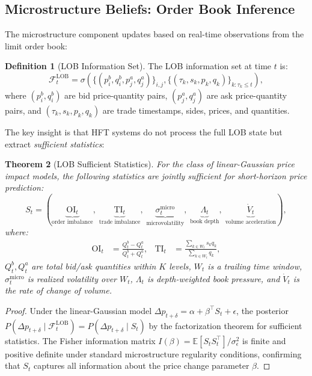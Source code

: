 \documentclass[12pt,a4paper]{article}
\newtheorem{theorem}{Theorem}[section]
\theoremstyle{definition}
\newtheorem{definition}[theorem]{Definition}
\newcommand{\E}{\mathbb{E}}
\newcommand{\F}{\mathcal{F}}
\begin{document}
\subsection{Microstructure Beliefs: Order Book Inference}

The microstructure component updates based on real-time observations from the limit order book:

\begin{definition}[LOB Information Set]\label{def:lob-info}
The LOB information set at time $t$ is:
\begin{equation}
  \F_t^{\mathrm{LOB}} = \sigma\left(\{(p_i^b, q_i^b, p_j^a, q_j^a)\}_{i,j}, \{(\tau_k, s_k, p_k, q_k)\}_{k: \tau_k \leq t}\right),
\end{equation}
where $(p_i^b, q_i^b)$ are bid price-quantity pairs, $(p_j^a, q_j^a)$ are ask price-quantity pairs, and $(\tau_k, s_k, p_k, q_k)$ are trade timestamps, sides, prices, and quantities.
\end{definition}

The key insight is that HFT systems do not process the full LOB state but extract \emph{sufficient statistics}:

\begin{theorem}[LOB Sufficient Statistics]\label{thm:lob-sufficient}
For the class of linear-Gaussian price impact models, the following statistics are jointly sufficient for short-horizon price prediction:
\begin{equation}\label{eq:sufficient-stats}
  S_t = \left(\underbrace{\mathrm{OI}_t}_{\text{order imbalance}},\; \underbrace{\mathrm{TI}_t}_{\text{trade imbalance}},\; \underbrace{\sigma_t^{\mathrm{micro}}}_{\text{microvolatility}},\; \underbrace{\Lambda_t}_{\text{book depth}},\; \underbrace{\dot{V}_t}_{\text{volume acceleration}}\right),
\end{equation}
where:
\begin{align}
  \mathrm{OI}_t &= \frac{Q_t^b - Q_t^a}{Q_t^b + Q_t^a}, &
  \mathrm{TI}_t &= \frac{\sum_{k \in W_t} s_k q_k}{\sum_{k \in W_t} q_k},
\end{align}
$Q_t^b, Q_t^a$ are total bid/ask quantities within $K$ levels, $W_t$ is a trailing time window, $\sigma_t^{\mathrm{micro}}$ is realized volatility over $W_t$, $\Lambda_t$ is depth-weighted book pressure, and $\dot{V}_t$ is the rate of change of volume.
\end{theorem}

\begin{proof}
Under the linear-Gaussian model $\Delta p_{t+\delta} = \alpha + \beta^\top S_t + \epsilon$, the posterior $P(\Delta p_{t+\delta} \mid \F_t^{\mathrm{LOB}}) = P(\Delta p_{t+\delta} \mid S_t)$ by the factorization theorem for sufficient statistics. The Fisher information matrix $I(\beta) = \E[S_t S_t^\top] / \sigma_\epsilon^2$ is finite and positive definite under standard microstructure regularity conditions, confirming that $S_t$ captures all information about the price change parameter $\beta$.
\end{proof}
\end{document}

